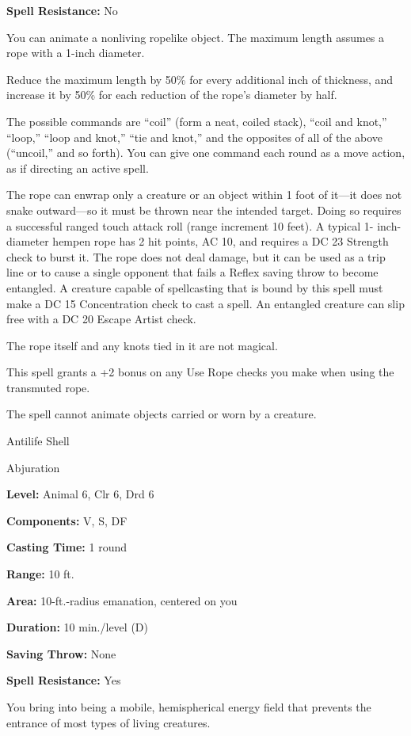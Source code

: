 \documentclass{article}
\begin{document}
\textbf{Spell Resistance:} No

You can animate a nonliving ropelike object. The maximum length assumes a rope 
with a 1-inch diameter.

Reduce the maximum length by 50\% for every additional inch of thickness, and increase 
it by 50\% for each reduction of the rope's diameter by half.

The possible commands are ``coil'' (form a neat, coiled stack), ``coil and knot,'' 
``loop,'' ``loop and knot,'' ``tie and knot,'' and the opposites of all of the 
above (``uncoil,'' and so forth). You can give one command each round as a move 
action, as if directing an active spell.

The rope can enwrap only a creature or an object within 1 foot of it---it does 
not snake outward---so it must be thrown near the intended target. Doing so requires 
a successful ranged touch attack roll (range increment 10 feet). A typical 1- inch-diameter 
hempen rope has 2 hit points, AC 10, and requires a DC 23 Strength check to burst 
it. The rope does not deal damage, but it can be used as a trip line or to cause 
a single opponent that fails a Reflex saving throw to become entangled. A creature 
capable of spellcasting that is bound by this spell must make a DC 15 Concentration 
check to cast a spell. An entangled creature can slip free with a DC 20 Escape 
Artist check.

The rope itself and any knots tied in it are not magical.

This spell grants a +2 bonus on any Use Rope checks you make when using the transmuted 
rope.

The spell cannot animate objects carried or worn by a creature.

\vspace{12pt}
Antilife Shell

Abjuration

\textbf{Level:} Animal 6, Clr 6, Drd 6

\textbf{Components:} V, S, DF

\textbf{Casting Time:} 1 round

\textbf{Range:} 10 ft.

\textbf{Area:} 10-ft.-radius emanation, centered on you

\textbf{Duration:} 10 min./level (D)

\textbf{Saving Throw:} None

\textbf{Spell Resistance:} Yes

You bring into being a mobile, hemispherical energy field that prevents the entrance 
of most types of living creatures.
\end{document}
